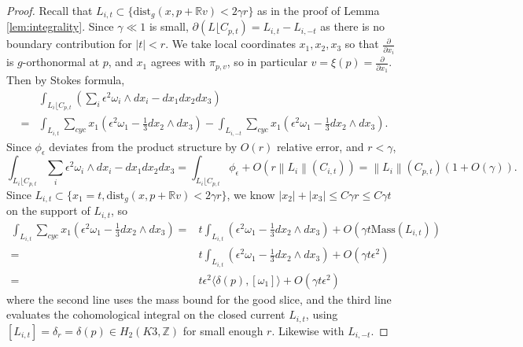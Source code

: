 \documentclass[10pt,a4paper]{amsart}
\newcommand{\R}{\mathbb{R}}
\newcommand{\Z}{\mathbb{Z}}
\newcommand{\norm}[1]{\left\lVert#1\right\rVert}
\begin{document}
\begin{proof}
		
			
			
			

			
			
			Recall that $L_{i,t}\subset   \{   \text{dist}_g(x, p+ \R v) <2 \gamma r   \}   $ as in the proof of Lemma \ref{lem:integrality}. Since $\gamma \ll 1$ is small, $\partial ( L\lfloor C_{p,t} )= L_{i,t}- L_{i,-t}$ as there is no boundary contribution for $|t|<r$. We take local coordinates $x_1, x_2, x_3$ so that $\frac{\partial}{\partial x_i}$ is $g$-orthonormal at $p$, and $x_1$ agrees with $\pi_{p,v}$, so in particular $v= \xi(p)= \frac{\partial}{\partial x_1}$. 
			Then by Stokes formula,
			\begin{equation}
				\begin{split}
					&	\int_{L_i  \lfloor C_{p,t} }(\sum_i \epsilon^2 \omega_i \wedge dx_i - dx_1dx_2dx_3)
					\\
					= & \int_{L_{i,t}} \sum_{cyc}  x_1(\epsilon^2\omega_1- \frac{1}{3}dx_2\wedge dx_3) -   \int_{L_{i,-t}} \sum_{cyc}  x_1(\epsilon^2\omega_1- \frac{1}{3}dx_2\wedge dx_3) .
				\end{split}
			\end{equation}
			Since $\phi_\epsilon$ deviates from the product structure by $O(r)$ relative error, and $r<\gamma$,
			\[
				\int_{L_i   \lfloor C_{p,t}   } \sum_i \epsilon^2\omega_i \wedge dx_i - dx_1dx_2dx_3= \int_{L_i   \lfloor C_{p,t}   } \phi_\epsilon +O(r\norm{L_i}(  C_{i,t}   ) )= \norm{L_i}(  C_{p,t}   ) (1+O(\gamma)).
			\]
			Since $L_{i,t}\subset   \{   x_1=t,  \text{dist}_g(x, p+ \R v) <2 \gamma r   \}   $, we know $|x_2|+ |x_3| \leq C\gamma r \leq C\gamma t$ on the support of $L_{i,t}$, so
			\[
			\begin{split}
					\int_{L_{i,t}} \sum_{cyc}  x_1(\epsilon^2 \omega_1- \frac{1}{3} dx_2\wedge dx_3) =&  t	\int_{L_{i,t}}  (\epsilon^2 \omega_1- \frac{1}{3} dx_2\wedge dx_3)  + O(\gamma  t \text{Mass}   (  {L_{i,t}} )  )
					\\
					=&  t	\int_{L_{i,t}}  (\epsilon^2 \omega_1- \frac{1}{3} dx_2\wedge dx_3)  + O(\gamma  t \epsilon^2 )
					\\
					= & t \epsilon^2 \langle \delta(p) , [\omega_1] \rangle + O(\gamma  t \epsilon^2 )
			\end{split}
			\]
			where the second line uses the mass bound for the good slice, and the third line evaluates the cohomological integral on the closed current $L_{i,t}$, using $[L_{i,t}]= \delta_r=\delta(p)\in H_2(K3,\Z)$ for small enough $r$. Likewise with $L_{i,-t}$.
			

\end{proof}
\end{document}
